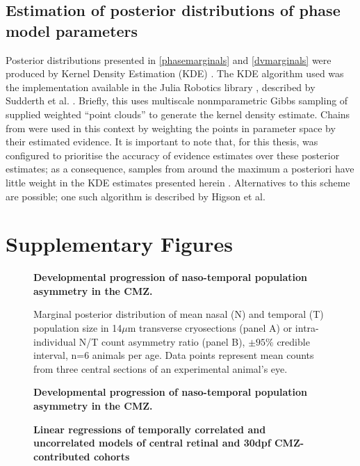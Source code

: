 \subsection{Estimation of posterior distributions of phase model parameters}
Posterior distributions presented in \autoref{phasemarginals} and \autoref{dvmarginals} were produced by Kernel Density Estimation (KDE) \cite[p. 122]{Bishop2006}. The KDE algorithm used was the implementation available in the Julia Robotics library , described by Sudderth et al. \cite{Sudderth2010}. Briefly, this uses multiscale nonmparametric Gibbs sampling of supplied weighted ``point clouds'' to generate the kernel density estimate. Chains from  were used in this context by weighting the points in parameter space by their estimated evidence. It is important to note that, for this thesis,  was configured to prioritise the accuracy of evidence estimates over these posterior estimates; as a consequence, samples from around the maximum a posteriori have little weight in the KDE estimates presented herein \cite{Higson2018}. Alternatives to this scheme are possible; one such algorithm is described by Higson et al. \cite{Higson2019}

\section{Supplementary Figures}

\begin{figure}[!h]
    \caption{{\bf Developmental progression of naso-temporal population asymmetry in the CMZ.}}
    \label{morphology}
\end{figure}

\begin{figure}[!h]
    \caption{{\bf Developmental progression of naso-temporal population asymmetry in the CMZ.}}
    Marginal posterior distribution of mean nasal (N) and temporal (T) population size in 14$\mu$m transverse cryosections (panel A) or intra-individual N/T count asymmetry ratio (panel B), $\pm 95\%$ credible interval, n=6 animals per age. Data points represent mean counts from three central sections of an experimental animal's eye. 
    \label{NTontology}
\end{figure}


\begin{figure}[!h]
    \caption{{\bf Linear regressions of temporally correlated and uncorrelated models of central retinal and 30dpf CMZ-contributed cohorts}}
    \label{a27linreg}
\end{figure}


